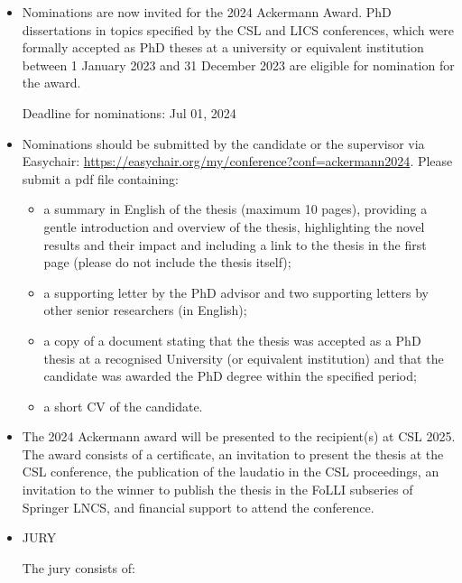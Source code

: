 \documentclass[prodmode,acmtecs]{acmsmall} %
\begin{document}
\begin{itemize}\item  Nominations are now invited for the 2024 Ackermann Award. PhD dissertations in topics specified by the CSL and LICS conferences, which were formally accepted as PhD theses at a university or equivalent institution between 1 January 2023 and 31 December 2023 are eligible for nomination for the award. 
 
Deadline for nominations: Jul 01, 2024 
 
\item  Nominations should be submitted by the candidate or the supervisor via Easychair: \href{https://easychair.org/my/conference?conf=ackermann2024}{https://easychair.org/my/conference?conf=ackermann2024}. Please submit a pdf file containing: 
 
\begin{itemize}\item  a summary in English of the thesis (maximum 10 pages), providing a gentle introduction and overview of the thesis, highlighting the novel results and their impact and including a link to the thesis in the first page (please do not include the thesis itself);
\item  a supporting letter by the PhD advisor and two supporting letters by other senior researchers (in English);
\item  a copy of a document stating that the thesis was accepted as a PhD thesis at a recognised University (or equivalent institution) and that the candidate was awarded the PhD degree within the specified period; 
\item  a short CV of the candidate.
\end{itemize} 
\item  The 2024 Ackermann award will be presented to the recipient(s) at CSL 2025. The award consists of a certificate, an invitation to present the thesis at the CSL conference, the publication of the laudatio in the CSL proceedings, an invitation to the winner to publish the thesis in the FoLLI subseries of Springer LNCS, and financial support to attend the conference. 
 
\item  JURY  
 
  The jury consists of: 
 

\end{itemize}
\end{document}
